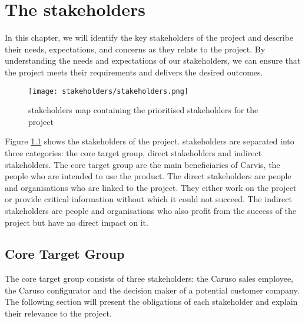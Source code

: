 \chapter{The \Glspl{stakeholder}}
In this chapter, we will identify the key \glspl{stakeholder} of the project and describe their needs, expectations, and concerns as they relate to the project. By understanding the needs and expectations of our \glspl{stakeholder}, we can ensure that the project meets their requirements and delivers the desired outcomes.
\begin{figure}[ht]
  \centering
  \texttt{[image: stakeholders/stakeholders.png]}
  \caption{\Glspl{stakeholder} map containing the prioritised  \glspl{stakeholder} for the project}
  \label{Kap2:Stakeholders}
\end{figure}
Figure \ref{Kap2:Stakeholders} shows the \glspl{stakeholder} of the project. \Glspl{stakeholder} are separated into three categories: the core target group, direct \glspl{stakeholder} and indirect \glspl{stakeholder}. The core target group are the main beneficiaries of Carvis, the people who are intended to use the product. The direct \glspl{stakeholder} are people and organisations who are linked to the project. They either work on the project or provide critical information without which it could not succeed. The indirect \glspl{stakeholder} are people and organisations who also profit from the success of the project but have no direct impact on it.

\section{Core Target Group}
The core target group consists of three \glspl{stakeholder}: the Caruso sales employee, the Caruso configurator and the decision maker of a potential customer company. The following section will present the obligations of each \gls{stakeholder} and explain their relevance to the project.

